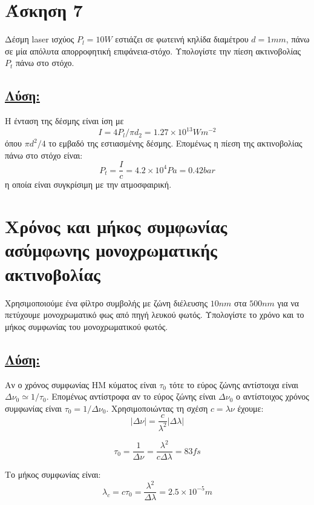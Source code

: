 \documentclass[a4paper,11pt,titlepage]{article}
\numberwithin{equation}{section} %
\begin{document}
\section{Άσκηση 7}

Δέσμη laser ισχύος $P_l=10W$ εστιάζει σε φωτεινή κηλίδα διαμέτρου $d=1mm$, πάνω σε μία απόλυτα απορροφητική επιφάνεια-στόχο. Υπολογίστε την πίεση ακτινοβολίας $P_t$ πάνω στο στόχο.

\subsection*{\underline{Λύση:}}

Η ένταση της δέσμης είναι ίση με 
\begin{equation}
I=4P_l/{\pi}d_2=1.27\times10^{13} Wm^{-2}
\end{equation}
όπου ${\pi}d^2/4$ το εμβαδό της εστιασμένης δέσμης. Επομένως η πίεση της ακτινοβολίας πάνω στο στόχο είναι:
\begin{equation}
 P_t=\frac{I}{c}=4.2\times10^4Pa=0.42 bar
\end{equation}
η οποία είναι συγκρίσιμη με την ατμοσφαιρική.
\newpage
\section{Χρόνος και μήκος συμφωνίας ασύμφωνης μονοχρωματικής ακτινοβολίας}
Χρησιμοποιούμε ένα φίλτρο συμβολής με ζώνη διέλευσης $10nm$ στα $500nm$ για να πετύχουμε μονοχρωματικό φως από πηγή λευκού φωτός. Υπολογίστε το χρόνο και το μήκος συμφωνίας του μονοχρωματικού φωτός.

\subsection*{\underline{Λύση:}}

Αν ο χρόνος συμφωνίας ΗΜ κύματος είναι $\tau_0$ τότε το εύρος ζώνης αντίστοιχα είναι $\Delta\nu_0\simeq 1/\tau_0$. Επομένως αντίστροφα αν το εύρος ζώνης είναι $\Delta\nu_0$ ο αντίστοιχος χρόνος συμφωνίας είναι $\tau_0=1/\Delta\nu_0$. Χρησιμοποιώντας τη σχέση $c=\lambda\nu$ έχουμε:
\begin{equation}
 |\Delta\nu|=\frac{c}{\lambda^2}|\Delta\lambda|
\end{equation}

\begin{equation}
 \tau_0=\frac{1}{\Delta\nu}=\frac{\lambda^2}{c\Delta\lambda}=83fs
\end{equation}

Το μήκος συμφωνίας είναι:
\begin{equation}
 \lambda_c=c\tau_0=\frac{\lambda^2}{\Delta\lambda}=2.5\times10^{-5}m
\end{equation}
\end{document}
